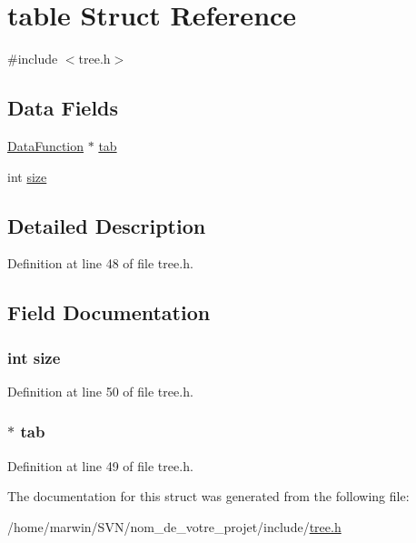 \hypertarget{structtable}{\section{table Struct Reference}
\label{structtable}
}


{\ttfamily \#include $<$tree.\-h$>$}

\subsection*{Data Fields}
\begin{DoxyCompactItemize}
\item 
\hyperlink{struct_data_function}{Data\-Function} $\ast$ \hyperlink{structtable_a20f340780940b3a557e1b67619541b14}{tab}
\item 
int \hyperlink{structtable_a439227feff9d7f55384e8780cfc2eb82}{size}
\end{DoxyCompactItemize}


\subsection{Detailed Description}


Definition at line 48 of file tree.\-h.



\subsection{Field Documentation}
\hypertarget{structtable_a439227feff9d7f55384e8780cfc2eb82}{
\subsubsection[{size}]{\setlength{\rightskip}{0pt plus 5cm}int size}}\label{structtable_a439227feff9d7f55384e8780cfc2eb82}


Definition at line 50 of file tree.\-h.

\hypertarget{structtable_a20f340780940b3a557e1b67619541b14}{
\subsubsection[{tab}]{$\ast$ tab}}\label{structtable_a20f340780940b3a557e1b67619541b14}


Definition at line 49 of file tree.\-h.



The documentation for this struct was generated from the following file\-:\begin{DoxyCompactItemize}
\item 
/home/marwin/\-S\-V\-N/nom\-\_\-de\-\_\-votre\-\_\-projet/include/\hyperlink{tree_8h}{tree.\-h}\end{DoxyCompactItemize}
